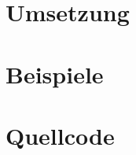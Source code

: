 \documentclass[a4paper,10pt,ngerman]{scrartcl}
\begin{document}
\section{Umsetzung}

\section{Beispiele}

\section{Quellcode}
\end{document}
